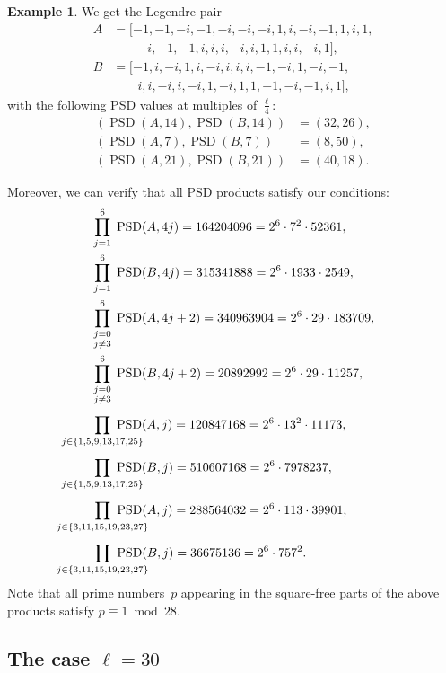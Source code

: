\documentclass{article}
\theoremstyle{definition}
\newtheorem{example}[theorem]{Example}
\newcommand{\PSD}{\operatorname{PSD}}
\begin{document}
\begin{example}
We get the Legendre pair 
\begin{align*}
A &= [-1, -1, -i, -1, -i, -i, -i, 1, i, -i, -1, 1, i, 1,\\
&\qquad {-i}, -1, -1, i, i, i, -i, i, 1, 1, i, i, -i, 1],\\
B &= [-1, i, -i, 1, i, -i, i, i, i, -1, -i, 1, -i, -1,\\
&\qquad i, i, -i, i, -i, 1, -i, 1, 1, -1, -i, -1, i, 1],
\end{align*}
with the following PSD values at multiples of $\frac{\ell}{4}$:
\begin{align*}
(\PSD(A,14),\PSD(B,14)) &= (32,26), \\
(\PSD(A,7),\PSD(B,7)) &= (8,50), \\
(\PSD(A,21),\PSD(B,21)) &= (40,18).
\end{align*}

Moreover, we can verify that all PSD products satisfy our conditions:
\begin{align*}
& \alprod{j=1}^6\ \PSD(A,4j) = 164204096=2^6\cdot 7^2\cdot 52361, \\
& \alprod{j=1}^6\ \PSD(B,4j) = 315341888=2^6\cdot 1933 \cdot 2549, \\
& \alprod{\textstyle\genfrac{}{}{0pt}{}{j=0}{j\not=3}}^6\ \PSD(A,4j+2) =
  340963904 = 2^6 \cdot 29 \cdot 183709, \\
& \alprod{\textstyle\genfrac{}{}{0pt}{}{j=0}{j\not=3}}^6\ \PSD(B,4j+2) =
  20892992 = 2^6 \cdot 29 \cdot 11257, \\[1ex]
& \alprod{j\in \{1,5,9,13,17,25\}}\ \PSD(A,j) =
  120847168 = 2^6 \cdot 13^2 \cdot 11173, \\[1ex]
& \alprod{j\in \{1,5,9,13,17,25\}}\ \PSD(B,j) =
  510607168 = 2^6 \cdot 7978237, \\[1ex]
& \alprod{j\in \{3,11,15,19,23,27\}}\ \PSD(A,j) =
  288564032 = 2^6 \cdot 113 \cdot 39901, \\[1ex]
& \alprod{j\in \{3,11,15,19,23,27\}}\ \PSD(B,j) =
  36675136 = 2^6 \cdot 757^2.
\end{align*}
Note that all prime numbers~$p$ appearing in the square-free parts of the above products satisfy $p\equiv1\bmod28$.

\end{example}


\subsection{The case \texorpdfstring{$\ell=30$}{l=30}}
\end{document}
